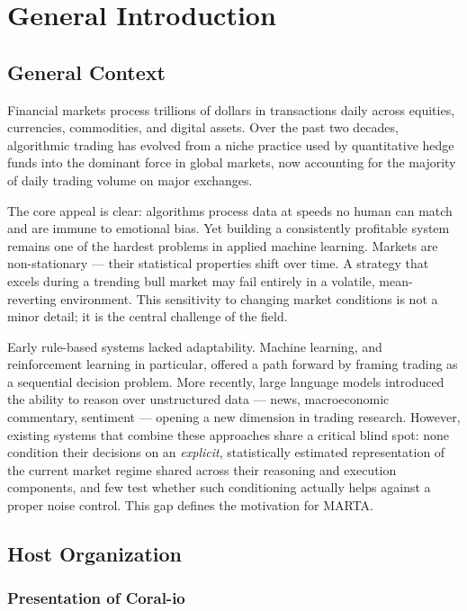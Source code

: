 \chapter{General Introduction}
\label{chap:introduction}

\section{General Context}
\label{sec:general-context}

Financial markets process trillions of dollars in transactions daily across equities, currencies, commodities, and digital assets. Over the past two decades, algorithmic trading has evolved from a niche practice used by quantitative hedge funds into the dominant force in global markets, now accounting for the majority of daily trading volume on major exchanges.

The core appeal is clear: algorithms process data at speeds no human can match and are immune to emotional bias. Yet building a consistently profitable system remains one of the hardest problems in applied machine learning. Markets are non-stationary --- their statistical properties shift over time. A strategy that excels during a trending bull market may fail entirely in a volatile, mean-reverting environment. This sensitivity to changing market conditions is not a minor detail; it is the central challenge of the field.

Early rule-based systems lacked adaptability. Machine learning, and reinforcement learning in particular, offered a path forward by framing trading as a sequential decision problem. More recently, large language models introduced the ability to reason over unstructured data --- news, macroeconomic commentary, sentiment --- opening a new dimension in trading research. However, existing systems that combine these approaches share a critical blind spot: none condition their decisions on an \emph{explicit}, statistically estimated representation of the current market regime shared across their reasoning and execution components, and few test whether such conditioning actually helps against a proper noise control. This gap defines the motivation for MARTA.

\section{Host Organization}
\label{sec:host-organization}

\subsection{Presentation of Coral-io}
\label{subsec:coral-io-presentation}

